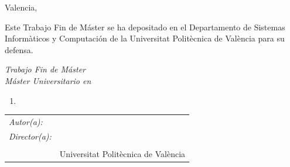 \begin{titlepage}
\begin{center}
Valencia, \Fecha
\end{center}

\newpage
\thispagestyle{empty}
\noindent
Este Trabajo Fin de Máster se ha depositado en el Departamento de Sistemas Informàticos y Computación de la Universitat Politècnica de València para su defensa.

\vspace*{4cm}
\noindent
\textit{Trabajo Fin de Máster}\\
\textit{Máster Universitario en} \Master{}

\begin{enumerate}
\item[\textit{Título:}] \TituloTFM{}
\end{enumerate}
\Fecha


\vspace*{3cm}

\noindent
\begin{tabular}{ll}
\textit{Autor(a):} & \NombreAutor{}  \\ 
\textit{Director(a):} & \NombreDirector{}  \\ 
                & \Departamento{} \\
                & Universitat Politècnica de València  \\


\end{tabular} 

\end{titlepage}
